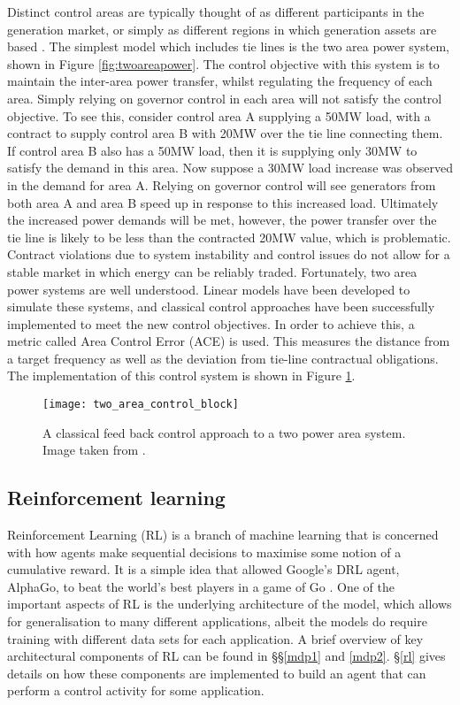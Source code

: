 Distinct control areas are typically thought of as different participants in the generation market, or simply as different regions in which generation assets are based \cite{Kothari2011}. The simplest model which includes tie lines is the two area power system, shown in Figure \ref{fig:twoareapower}. The control objective with this system is to maintain the inter-area power transfer, whilst regulating the frequency of each area. Simply relying on governor control in each area will not satisfy the control objective. To see this, consider control area A supplying a 50MW load, with a contract to supply control area B with 20MW over the tie line connecting them. If control area B also has a 50MW load, then it is supplying only 30MW to satisfy the demand in this area. Now suppose a 30MW load increase was observed in the demand for area A. Relying on governor control will see generators from both area A and area B speed up in response to this increased load. Ultimately the increased power demands will be met, however, the power transfer over the tie line is likely to be less than the contracted 20MW value, which is problematic. Contract violations due to system instability and control issues do not allow for a stable market in which energy can be reliably traded. Fortunately, two area power systems are well understood. Linear models have been developed to simulate these systems, and classical control approaches have been successfully implemented to meet the new control objectives. In order to achieve this, a metric called Area Control Error (ACE) is used. This measures the distance from a target frequency as well as the deviation from tie-line contractual obligations. The implementation of this control system is shown in Figure \ref{fig:twoareacontrolblock}.

\vspace{2cm}

\begin{figure}[ht]
	\centering
	\texttt{[image: two\_area\_control\_block]}
	\caption{A classical feed back control approach to a two power area system. Image taken from \cite{Kothari2011}.}
	\label{fig:twoareacontrolblock}
\end{figure}

\newpage

\subsection{Reinforcement learning}
Reinforcement Learning (RL) is a branch of machine learning that is concerned with how agents make sequential decisions to maximise some notion of a cumulative reward. It is a simple idea that allowed Google's DRL agent, AlphaGo, to beat the world's best players in a game of Go \cite{Silver2016}. One of the important aspects of RL is the underlying architecture of the model, which allows for generalisation to many different applications, albeit the models do require training with different data sets for each application. A brief overview of key architectural components of RL can be found in \S{}\S{}\ref{mdp1} and \ref{mdp2}. \S{}\ref{rl} gives details on how these components are implemented to build an agent that can perform a control activity for some application.

